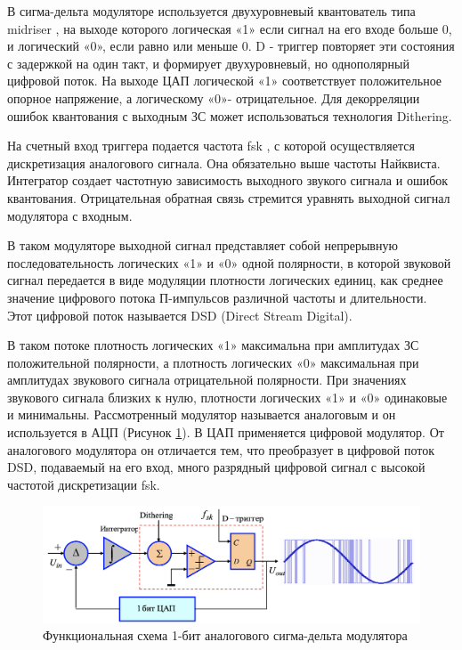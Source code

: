 \documentclass[12pt,a4paper,oneside]{report}
\begin{document}
В сигма-дельта модуляторе используется двухуровневый квантователь типа midriser , на выходе которого логическая «1» если сигнал на его входе больше 0, и логический «0», если равно или меньше 0. D - триггер повторяет эти состояния с задержкой на один такт, и формирует двухуровневый, но однополярный цифровой поток. На выходе ЦАП логической «1» соответствует положительное опорное напряжение, а логическому «0»- отрицательное. Для декорреляции ошибок квантования с выходным ЗС может использоваться технология Dithering.

На счетный вход триггера подается частота fsk , с которой осуществляется дискретизация аналогового сигнала. Она обязательно выше частоты Найквиста. Интегратор создает частотную зависимость выходного звукого сигнала и ошибок квантования. Отрицательная обратная связь стремится уравнять выходной сигнал модулятора с входным.

В таком модуляторе выходной сигнал представляет собой непрерывную последовательность логических «1» и «0» одной полярности, в которой звуковой сигнал передается в виде модуляции плотности логических единиц, как среднее значение цифрового потока П-импульсов различной частоты и длительности. Этот цифровой поток называется DSD (Direct Stream Digital).

В таком потоке плотность логических «1» максимальна при амплитудах ЗС положительной полярности, а плотность логических «0» максимальная при амплитудах звукового сигнала отрицательной полярности. При значениях звукового сигнала близких к нулю, плотности логических «1» и «0» одинаковые и минимальны.
Рассмотренный модулятор называется аналоговым и он используется в АЦП (Рисунок \ref{ris:anmod}). В ЦАП применяется цифровой модулятор. От аналогового модулятора он отличается тем, что преобразует в цифровой поток DSD, подаваемый на его вход, много разрядный цифровой сигнал с высокой частотой дискретизации fsk.

\begin{figure}[!htbp]
	\centering
	\includegraphics[scale=0.4]{anmod.png}
	\caption{Функциональная схема 1-бит аналогового сигма-дельта модулятора}
	\label{ris:anmod}
\end{figure}
\end{document}
